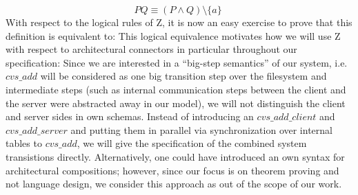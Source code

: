 \[ PQ \equiv (P \land Q) \setminus \{a\} \; \]
With respect to the logical rules of Z, it is now an easy exercise to
prove that this definition is equivalent to:
This logical equivalence motivates how we will use Z with respect to
architectural connectors in particular throughout our specification:
Since we are interested in a ``big-step semantics'' of our system,
i.e.\ $cvs\_add$ will be considered as one big transition step over
the filesystem and intermediate steps (such as internal communication
steps between the client and the server were abstracted away in our model),
we will not distinguish the client and server sides in own schemas.
Instead of introducing an $cvs\_add\_client$ and $cvs\_add\_server$ and putting
them in parallel via synchronization over internal tables to $cvs\_add$,
we will give the specification of the combined system transistions
directly. Alternatively, one could have introduced an own syntax for
architectural compositions; however, since our focus is on theorem
proving and not language design, we consider this approach as out
of the scope of our work. 
